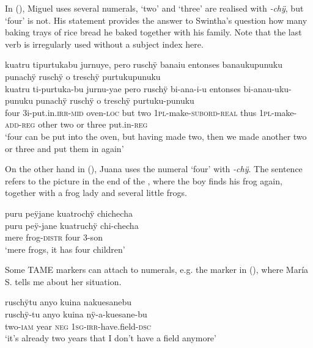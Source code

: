 In (), Miguel uses several numerals, ‘two’ and ‘three’ are realised with \textit{-chÿ}, but ‘four’ is not. His statement provides the answer to Swintha’s question how many baking trays of rice bread he baked together with his family. Note that the last verb is irregularly used without a subject index here.

\ea\label{ex:two-1}
\begingl
\glpreamble kuatru tipurtukabu jurnuye, pero ruschÿ banaiu entonses banaukupunuku punachÿ ruschÿ o treschÿ purtukupunuku\\
\gla kuatru ti-purtuka-bu jurnu-yae pero ruschÿ bi-ana-i-u entonses bi-anau-uku-punuku punachÿ ruschÿ o treschÿ purtuku-punuku\\
\glb four 3i-put.in.\textsc{irr}-\textsc{mid} oven-\textsc{loc} but two 1\textsc{pl}-make-\textsc{subord}-\textsc{real} thus 1\textsc{pl}-make-\textsc{add}-\textsc{reg} other two or three put.in-\textsc{reg}\\
\glft ‘four can be put into the oven, but having made two, then we made another two or three and put them in again’
\endgl
\trailingcitation{[mxx-e120415ls.096-097]}
\xe


On the other hand in (), Juana uses the numeral ‘four’ with \textit{-chÿ}. The sentence refers to the picture in the end of the , where the boy finds his frog again, together with a frog lady and several little frogs.

\ea\label{ex:four-1}
\begingl
\glpreamble puru peÿjane kuatrochÿ chichecha\\
\gla puru peÿ-jane kuatruchÿ chi-checha\\
\glb mere frog-\textsc{distr} four 3-son \\
\glft ‘mere frogs, it has four children’
\endgl
\trailingcitation{[jxx-a120516l-a.435]}
\xe

Some TAME markers can attach to numerals, e.g. the  marker in (), where María S. tells me about her situation.

\ea\label{ex:two-3}
\begingl
\glpreamble ruschÿtu anyo kuina nakuesanebu\\
\gla ruschÿ-tu anyo kuina nÿ-a-kuesane-bu\\
\glb two-\textsc{iam} year \textsc{neg} 1\textsc{sg}-\textsc{irr}-have.field-\textsc{dsc}\\
\glft ‘it’s already two years that I don’t have a field anymore’
\endgl
\trailingcitation{[rxx-e181017l.018]}
\xe

